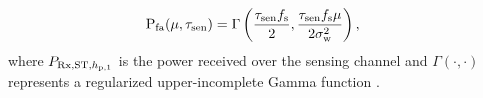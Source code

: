 \begin{align}
\text{P}_{\text{fa}}(\mu, \tau_{\text{sen}}) &= \Gamma\left( \frac{\tau_{\text{sen}} f_{\text{s}}}{2}, \frac{\tau_{\text{sen}} f_{\text{s}} \mu}{2 \sigma^2_{\text{w}}} \right),  \label{eq_IS:pfa} 
\end{align}
where $P_{\text{Rx,ST,$h_{\text{p,1}}$}}$ is the power received over the sensing channel and $\Gamma(\cdot, \cdot)$ represents a regularized upper-incomplete Gamma function \cite{grad}.%



